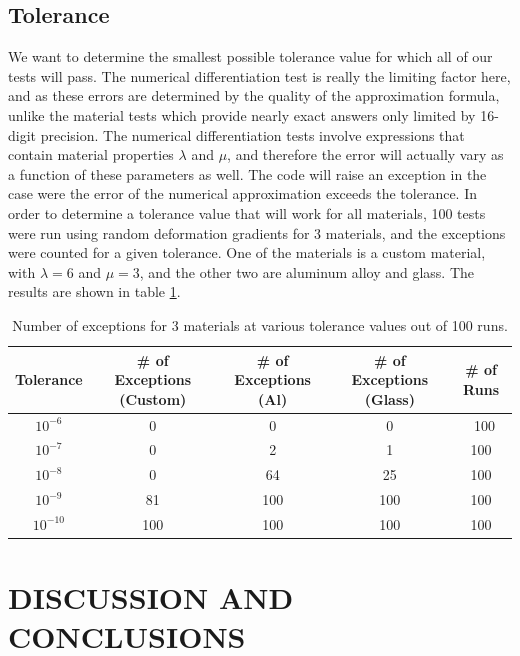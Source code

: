\documentclass[]{spie}  %
\newcommand\Tstrut{\rule{0pt}{2.6ex}}         %
\begin{document}
\subsection{Tolerance}
We want to determine the smallest possible tolerance value for which all of our tests will pass. The numerical differentiation test is really the limiting factor here, and as these errors are determined by the quality of the approximation formula, unlike the material tests which provide nearly exact answers only limited by 16-digit precision. The numerical differentiation tests involve expressions that contain material properties $\lambda$ and $\mu$, and therefore the error will actually vary as a function of these parameters as well. The code will raise an exception in the case were the error of the numerical approximation exceeds the tolerance. In order to determine a tolerance value that will work for all materials, 100 tests were run using random deformation gradients for 3 materials, and the exceptions were counted for a given tolerance. One of the materials is a custom material, with $\lambda = 6$ and $\mu = 3$, and the other two are aluminum alloy and glass. The results are shown in table \ref{table: tolerance}. 

\begin{table}[h]
	\centering
	\caption{Number of exceptions for 3 materials at various tolerance values out of 100 runs.}
	\begin{tabular}{ | c | c | c | c | c |}
		\hline
		Tolerance  & \# of Exceptions (Custom) & \# of Exceptions (Al) & \# of Exceptions (Glass) & \# of Runs \Tstrut \\ \hline
		$10^{-6}$  & 0   & 0   & 0   & \ 100 \Tstrut \\
		$10^{-7}$  & 0   & 2   & 1   & 100 \\
		$10^{-8}$  & 0   & 64  & 25  & 100 \\
		$10^{-9}$  & 81  & 100 & 100 & 100 \\
		$10^{-10}$ & 100 & 100 & 100 & 100 \\
		\hline
	\end{tabular}
	\label{table: tolerance}
\end{table}

\section{DISCUSSION AND CONCLUSIONS}
\label{sec: discussion}
\end{document}
